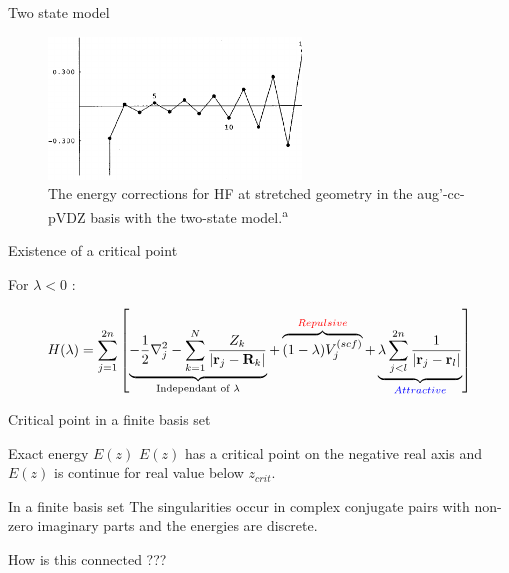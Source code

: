 \documentclass[xcolor=x11names,compress]{beamer}
\renewcommand{\(}{\begin{columns}}
\renewcommand{\)}{\end{columns}}
\newcommand{\<}[1]{\begin{column}{#1}}
\renewcommand{\>}{\end{column}}
\begin{document}
\begin{frame}{Two state model}
  
\begin{figure}
    \centering
    \includegraphics[width=0.6\textwidth]{figure-fig14.png}
    \caption{\centering The energy corrections for HF at stretched geometry in the aug'-cc-pVDZ basis with the two-state model.\textsuperscript{a}}
    \label{fig:my_label}
\end{figure}
    

\end{frame}

\begin{frame}{Existence of a critical point}

For $\lambda<0$ :

\begin{equation*}
    H(\lambda)=\sum\limits_{j=1}^{2n}\left[ \underbrace{-\frac{1}{2}\nabla_j^2 - \sum\limits_{k=1}^{N} \frac{Z_k}{|\vb{r}_j-\vb{R}_k|}}_{\text{Independant of }\lambda} + \overbrace{(1-\lambda)V_j^{(scf)}}^{\textcolor{red}{Repulsive}}+\underbrace{\lambda\sum\limits_{j<l}^{2n}\frac{1}{|\vb{r}_j-\vb{r}_l|}}_{\textcolor{blue}{Attractive}}  \right]
\end{equation*}

\end{frame}

\begin{frame}{Critical point in a finite basis set}
    
\begin{beamerboxesrounded}[scheme=foncé]{\centering Exact energy $E(z)$}
$E(z)$ has a critical point on the negative real axis and $E(z)$ is continue for real value below $z_{crit}$.
\end{beamerboxesrounded}

\vspace{0.5cm}

\begin{beamerboxesrounded}[scheme=foncé]{\centering In a finite basis set}
The singularities occur in complex conjugate pairs with non-zero imaginary parts and the energies are discrete. 
\end{beamerboxesrounded}

\vspace{0.5cm}

\centering \Large{How is this connected ???}
    
\end{frame}
\end{document}
